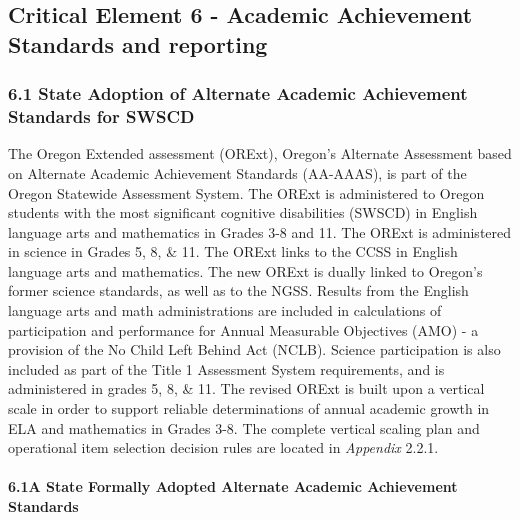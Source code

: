 \documentclass[]{article}
\title{}
\author{}
\date{}
\let\oldparagraph\paragraph
\renewcommand{\paragraph}[1]{\oldparagraph{#1}\mbox{}}
\begin{document}
{
\setcounter{tocdepth}{5}
\tableofcontents
}
\hypertarget{critical-element-6---academic-achievement-standards-and-reporting}{%
\subsection{Critical Element 6 - Academic Achievement Standards and
reporting}\label{critical-element-6---academic-achievement-standards-and-reporting}}

\hypertarget{state-adoption-of-alternate-academic-achievement-standards-for-swscd}{%
\subsubsection{6.1 State Adoption of Alternate Academic Achievement
Standards for
SWSCD}\label{state-adoption-of-alternate-academic-achievement-standards-for-swscd}}

The Oregon Extended assessment (ORExt), Oregon's Alternate Assessment
based on Alternate Academic Achievement Standards (AA-AAAS), is part of
the Oregon Statewide Assessment System. The ORExt is administered to
Oregon students with the most significant cognitive disabilities (SWSCD)
in English language arts and mathematics in Grades 3-8 and 11. The ORExt
is administered in science in Grades 5, 8, \& 11. The ORExt links to the
CCSS in English language arts and mathematics. The new ORExt is dually
linked to Oregon's former science standards, as well as to the NGSS.
Results from the English language arts and math administrations are
included in calculations of participation and performance for Annual
Measurable Objectives (AMO) - a provision of the No Child Left Behind
Act (NCLB). Science participation is also included as part of the Title
1 Assessment System requirements, and is administered in grades 5, 8, \&
11. The revised ORExt is built upon a vertical scale in order to support
reliable determinations of annual academic growth in ELA and mathematics
in Grades 3-8. The complete vertical scaling plan and operational item
selection decision rules are located in \emph{Appendix} 2.2.1.

\hypertarget{a-state-formally-adopted-alternate-academic-achievement-standards}{%
\paragraph{6.1A State Formally Adopted Alternate Academic Achievement
Standards}\label{a-state-formally-adopted-alternate-academic-achievement-standards}}
\end{document}
